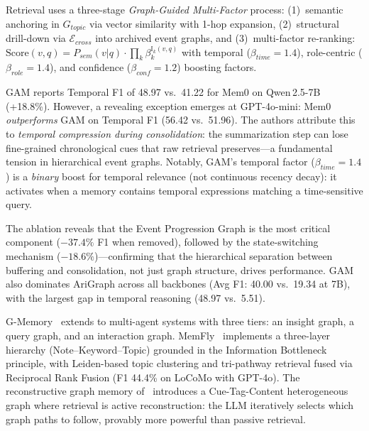 \documentclass[hf]{ceurart}
\begin{document}
Retrieval uses a three-stage \emph{Graph-Guided Multi-Factor} process:
(1)~semantic anchoring in $G_{topic}$ via vector similarity with 1-hop
expansion, (2)~structural drill-down via $\mathcal{E}_{cross}$ into
archived event graphs, and (3)~multi-factor re-ranking:
$\text{Score}(v,q) = P_{sem}(v|q) \cdot \prod_{k} \beta_k^{\mathbb{I}_k(v,q)}$
with temporal ($\beta_{time}{=}1.4$), role-centric ($\beta_{role}{=}1.4$),
and confidence ($\beta_{conf}{=}1.2$) boosting factors.

GAM reports Temporal F1 of 48.97 vs.\ 41.22 for Mem0 on Qwen\,2.5-7B
(+18.8\%). However, a revealing exception emerges at GPT-4o-mini:
Mem0 \emph{outperforms} GAM on Temporal F1 (56.42 vs.\ 51.96). The
authors attribute this to \emph{temporal compression during
consolidation}: the summarization step can lose fine-grained
chronological cues that raw retrieval preserves---a fundamental
tension in hierarchical event graphs. Notably, GAM's temporal factor
($\beta_{time}{=}1.4$) is a \emph{binary} boost for temporal
relevance (not continuous recency decay): it activates when a memory
contains temporal expressions matching a time-sensitive query.

The ablation reveals that the Event Progression Graph is the most
critical component ($-37.4\%$ F1 when removed), followed by the
state-switching mechanism ($-18.6\%$)---confirming that the hierarchical
separation between buffering and consolidation, not just graph structure,
drives performance. GAM also dominates AriGraph across all backbones
(Avg F1: 40.00 vs.\ 19.34 at 7B), with the largest gap in temporal
reasoning (48.97 vs.\ 5.51).

G-Memory~\cite{gmemory2025} extends to multi-agent systems with three
tiers: an insight graph, a query graph, and an interaction graph.
MemFly~\cite{memfly2026} implements a three-layer hierarchy
(Note--Keyword--Topic) grounded in the Information Bottleneck
principle, with Leiden-based topic clustering and tri-pathway retrieval
fused via Reciprocal Rank Fusion (F1 44.4\% on LoCoMo with GPT-4o).
The reconstructive graph memory of~\cite{ctc2026} introduces a
Cue-Tag-Content heterogeneous graph where retrieval is active
reconstruction: the LLM iteratively selects which graph paths to
follow, provably more powerful than passive retrieval.
\end{document}
